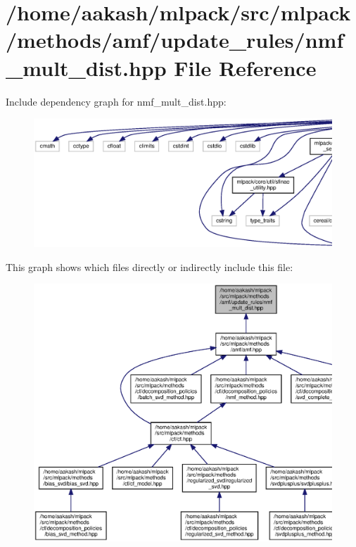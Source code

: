 \section{/home/aakash/mlpack/src/mlpack/methods/amf/update\+\_\+rules/nmf\+\_\+mult\+\_\+dist.hpp File Reference}
\label{nmf__mult__dist_8hpp}
Include dependency graph for nmf\+\_\+mult\+\_\+dist.\+hpp\+:
\nopagebreak
\begin{figure}[H]
\begin{center}
\leavevmode
\includegraphics[width=350pt]{nmf__mult__dist_8hpp__incl}
\end{center}
\end{figure}
This graph shows which files directly or indirectly include this file\+:
\nopagebreak
\begin{figure}[H]
\begin{center}
\leavevmode
\includegraphics[width=350pt]{nmf__mult__dist_8hpp__dep__incl}
\end{center}
\end{figure}
